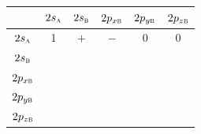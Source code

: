 \begin{tabular}{|c||c|c|c|c|c|}
\hline
                   & $2s_\textsc{a}$ & $2s_\textsc{b}$ & $2p_{x\textsc{b}}$ & $2p_{y\textsc{b}}$ & $2p_{z\textsc{b}}$ \\
\hline\hline
$2s_\textsc{a}$     & 1 & $+$ & $-$ & 0 & 0 \\ \hline
$2s_\textsc{b}$     &&&&& \\ \hline
$2p_{x\textsc{b}}$  &&&&& \\ \hline
$2p_{y\textsc{b}}$  &&&&& \\ \hline
$2p_{z\textsc{b}}$  &&&&& \\ \hline
\end{tabular}
